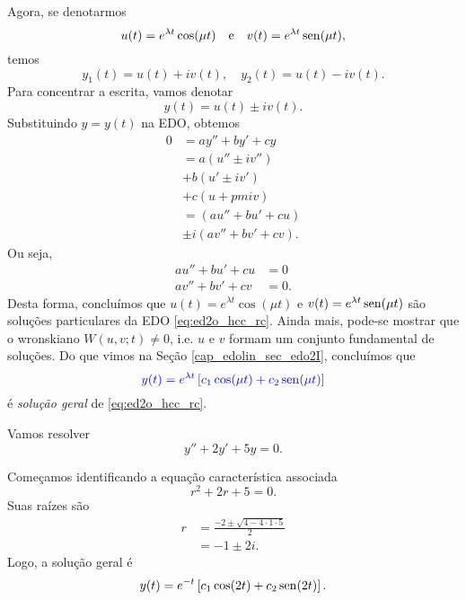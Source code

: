 Agora, se denotarmos
\begin{equation}
  u(t) = e^{\lambda t}\cos(\mu t)\quad\text{e}\quad v(t) = e^{\lambda t}\operatorname{sen}(\mu t),
\end{equation}
temos
\begin{equation}
  y_1(t) = u(t) + iv(t),\quad y_2(t) = u(t) - iv(t).
\end{equation}
Para concentrar a escrita, vamos denotar
\begin{equation}
  y(t) = u(t) \pm iv(t).
\end{equation}
Substituindo $y = y(t)$ na EDO, obtemos
\begin{align}
  0 &= ay'' + by' + cy \\
    &= a(u'' \pm iv'') \\
    &+ b(u' \pm iv') \\
    &+ c(u + pm iv) \\
    &= (au'' + bu' + cu) \\
    &\pm i(av'' + bv' + cv).
\end{align}
Ou seja,
\begin{align}
  au'' + bu' + cu &= 0 \\
  av'' + bv' + cv &= 0.
\end{align}
Desta forma, concluímos que $u(t) = e^{\lambda t}\cos(\mu t)$ e $v(t) = e^{\lambda t}\operatorname{sen}(\mu t)$ são soluções particulares da EDO \eqref{eq:ed2o_hcc_rc}. Ainda mais, pode-se mostrar que o wronskiano $W(u,v;t)\neq 0$, i.e. $u$ e $v$ formam um conjunto fundamental de soluções. Do que vimos na Seção \ref{cap_edolin_sec_edo2I}, concluímos que
\begin{equation}
  {\color{blue}y(t) = e^{\lambda t}\left[c_1\cos(\mu t) + c_2\operatorname{sen}(\mu t)\right]}
\end{equation}
é \emph{solução geral} de \eqref{eq:ed2o_hcc_rc}.

\begin{ex}
  Vamos resolver
  \begin{equation}
    y'' + 2y' + 5y = 0.
  \end{equation}

  Começamos identificando a equação característica associada
  \begin{equation}
    r^2 + 2r + 5 = 0.
  \end{equation}
  Suas raízes são
  \begin{align}
    r &= \frac{-2 \pm \sqrt{4 - 4\cdot 1\cdot 5}}{2} \\
      &= -1 \pm 2i.
  \end{align}
  Logo, a solução geral é
  \begin{equation}
    y(t) = e^{-t}\left[c_1\cos(2t) + c_2\operatorname{sen}(2t)\right].
  \end{equation}
\end{ex}

